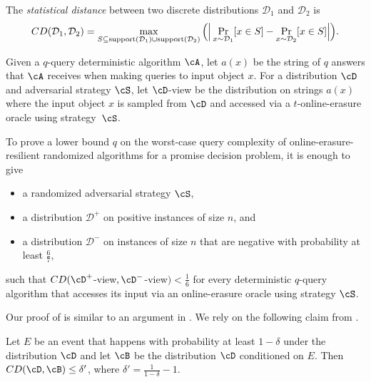 \documentclass{toc}
\begin{document}
	
	\begin{definition}The {\em statistical distance} between two discrete distributions $\mathcal{D}_1$ and $\mathcal{D}_2$ is
\begin{align*}
	    CD(\mathcal{D}_1, \mathcal{D}_2) = \max_{S \subseteq \textnormal{support}(\mathcal{D}_1) \cup \textnormal{support}(\mathcal{D}_2)} \Big( \Big| \Pr_{x \sim \mathcal{D}_1} [ x \in S] - \Pr_{x \sim \mathcal{D}_2} [ x \in S] \Big|\Big).
\end{align*}
	\end{definition}
	
\begin{definition} Given a $q$-query deterministic algorithm $\cA$, let $a(x)$ be the string of $q$ answers that $\cA$ receives when making queries to input object $x$. For a distribution $\cD$ and adversarial strategy $\cS$, let $\cD$-view be the distribution on strings $a(x)$ where the input object $x$ is sampled from $\cD$ and accessed via a $t$-online-erasure oracle using strategy~$\cS$. 
\end{definition}
	

	
	
		\begin{corollary}\label{cor:yao_2}
		
To prove a lower bound $q$ on the worst-case query complexity of online-erasure-resilient randomized algorithms for a promise decision problem,
		it is enough to give 
		\begin{itemize}
		\item a randomized adversarial strategy $\cS$,
			\item a distribution $\mathcal{D}^+$ on positive instances of size $n$, and
			
			\item a distribution $\mathcal{D}^-$ on instances of size $n$ that are negative with probability at least $\frac{6}{7}$,
		\end{itemize}
		such that $CD(\cD^+$-view$, \cD^-$-view$) < \frac{1}{6}$ for every deterministic $q$-query algorithm that accesses its input via an online-erasure oracle using strategy $\cS$. 
	\end{corollary} 

%
%
Our proof of  is similar to
an argument in \cite{RS06}. We rely on the following claim from \cite{RS06}.


	\begin{claim}\label{clm:bad_event}
	Let $E$ be an event that happens with probability at least $1-\delta$ under the distribution $\cD$ and let $\cB$ be the distribution $\cD$ conditioned on $E$. Then $CD(\cD, \cB) \leq \delta'$, where $\delta' = \frac{1}{1-\delta} - 1$. 
	\end{claim}
%
%
%
%
%
%
%
%
%
\end{document}
